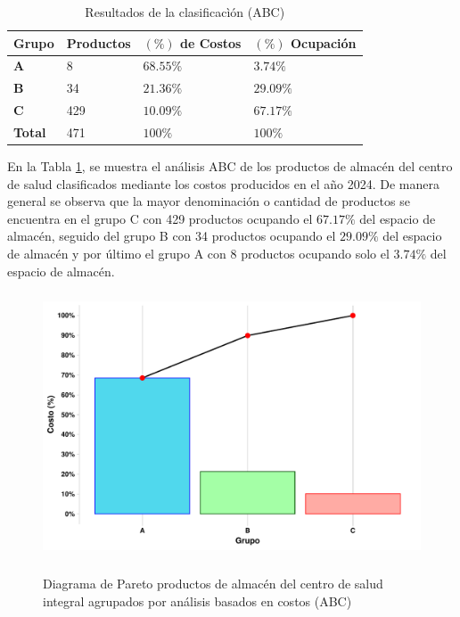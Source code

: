 \begin{table}[H]
    \caption{Resultados de la clasificacìón (ABC)}
    \begin{tabular}{p{0.8cm} p{2.51cm} p{5.2cm} p{4.9cm}} %
        \hline
        \textbf{Grupo} & \textbf{Productos} & \textbf{$(\%)$ de Costos} & \textbf{$(\%)$ Ocupación} \\
        \hline
        \textbf{A} & 8 & $68.55\%$ & $3.74\%$ \\
        \textbf{B} & 34 & $21.36\%$ & $29.09\%$ \\
        \textbf{C} & 429 & $10.09\%$ & $67.17\%$ \\
        \hline
        \textbf{Total} & 471 & $100\%$ & $100\%$
    \end{tabular}
    \label{table:ABC_productos}
\end{table}

En la Tabla \ref{table:ABC_productos}, se muestra el análisis ABC de los productos de almacén del centro de salud clasificados mediante los costos producidos en el año 2024. De manera general se observa que la mayor denominación o cantidad de productos se encuentra en el grupo C con 429 productos ocupando el $67.17\%$ del espacio de almacén, seguido del grupo B con 34 productos ocupando el $29.09\%$ del espacio de almacén y por último el grupo A con 8 productos ocupando solo el $3.74\%$ del espacio de almacén.

\newpage
\begin{figure}[H]
  \caption{Diagrama de Pareto productos de almacén del centro de salud integral agrupados por análisis basados en costos (ABC)}
  {\includegraphics[width=15cm, height=7.9cm]{images/ABC.pdf}}
  \label{fig:ABC_almacen}
\end{figure}

